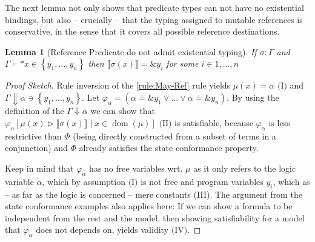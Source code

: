\documentclass[twoside, english]{sdqthesis}
\newcommand{\set}[1]{\left\{ #1 \right\}}
\newcommand{\bbracket}[1]{\llbracket #1 \rrbracket}
\newcommand{\tr}[0]{\triangleright}
\DeclareMathOperator{\dom}{dom}
\newtheorem{lemma}[theorem]{Lemma}
\theoremstyle{definition}
\begin{document}
The next lemma not only shows that predicate types can not have no existential bindings, but also -- crucially -- that the typing assigned to mutable references is conservative, in the sense that it covers all possible reference destinations.
\begin{lemma}[Reference Predicate do not admit existential typing]\label{lem:conservatice-reference-typing}
  If $\sigma : \Gamma $ and $\Gamma \vdash *x \in \set{y_1, \dots, y_n}$ then $\bbracket{\sigma(x)} = \&y_i$ for some $i \in 1, \dots, n$ 
\end{lemma}

\begin{proof}[Proof Sketch]
  Rule inversion of the \cref{rule:May-Ref} rule yields $\mu(x) = \alpha \text{ (I)}$ and $\Gamma\Downarrow \alpha \ni \set{y_1, \dots, y_n}$. 
  Let $\varphi_\alpha = (\alpha \doteq \&y_1 \vee \dots \vee \alpha \doteq \&y_n)$. By using the definition of the $\Gamma\Downarrow \alpha$ we can show that $\varphi_\alpha[\mu(x) \tr \bbracket{\sigma(x)} \mid x \in \dom(\mu)] \text{ (II)}$ is satisfiable, because $\varphi_\alpha$ is less restrictive than $\Phi$ (being directly constructed from a subset of terms in a conjunction) and $\Phi$ already satisfies the state conformance property. 

  Keep in mind that $\varphi_\alpha$ has no free variables wrt. $\mu$ as it only refers to the logic variable $\alpha$, which by assumption $\text{(I)}$ is not free and program variables $y_i$, which as -- as far as the logic is concerned -- mere constants (III). 
  The argument from the state conformance examples also applies here: If we can show a formula to be independent from the rest and the model, then showing satisfiability for a model that $\varphi_\alpha$ does not depends on, yields validity $\text{(IV)}$. 


\end{proof}
\end{document}
